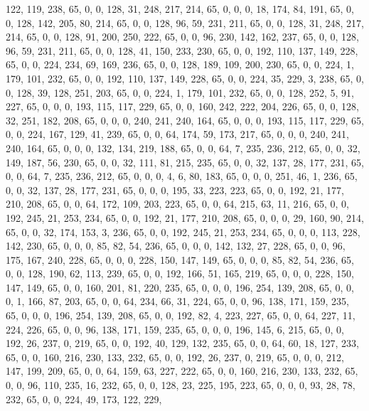 \begin{DoxyCode}
       122, 119, 238, 65, 0, 0, 128, 31, 248, 217, 214, 65, 0, 0, 0, 18, 174, 84, 191, 65, 0, 0, 128, 142, 205, 80,
       214, 65, 0, 0, 128, 96, 59, 231, 211, 65, 0, 0, 128, 31, 248, 217, 214, 65, 0, 0, 128, 91, 200, 250, 222, 65,
       0, 0, 96, 230, 142, 162, 237, 65, 0, 0, 128, 96, 59, 231, 211, 65, 0, 0, 128, 41, 150, 233, 230, 65, 0, 0,
       192, 110, 137, 149, 228, 65, 0, 0, 224, 234, 69, 169, 236, 65, 0, 0, 128, 189, 109, 200, 230, 65, 0, 0, 224,
       1, 179, 101, 232, 65, 0, 0, 192, 110, 137, 149, 228, 65, 0, 0, 224, 35, 229, 3, 238, 65, 0, 0, 128, 39, 128,
       251, 203, 65, 0, 0, 224, 1, 179, 101, 232, 65, 0, 0, 128, 252, 5, 91, 227, 65, 0, 0, 0, 193, 115, 117, 229,
       65, 0, 0, 160, 242, 222, 204, 226, 65, 0, 0, 128, 32, 251, 182, 208, 65, 0, 0, 0, 240, 241, 240, 164, 65,
       0, 0, 0, 193, 115, 117, 229, 65, 0, 0, 224, 167, 129, 41, 239, 65, 0, 0, 64, 174, 59, 173, 217, 65, 0, 0, 0,
       240, 241, 240, 164, 65, 0, 0, 0, 132, 134, 219, 188, 65, 0, 0, 64, 7, 235, 236, 212, 65, 0, 0, 32, 149, 187,
       56, 230, 65, 0, 0, 32, 111, 81, 215, 235, 65, 0, 0, 32, 137, 28, 177, 231, 65, 0, 0, 64, 7, 235, 236, 212,
       65, 0, 0, 0, 4, 6, 80, 183, 65, 0, 0, 0, 251, 46, 1, 236, 65, 0, 0, 32, 137, 28, 177, 231, 65, 0, 0, 0, 195,
       33, 223, 223, 65, 0, 0, 192, 21, 177, 210, 208, 65, 0, 0, 64, 172, 109, 203, 223, 65, 0, 0, 64, 215, 63,
       11, 216, 65, 0, 0, 192, 245, 21, 253, 234, 65, 0, 0, 192, 21, 177, 210, 208, 65, 0, 0, 0, 29, 160, 90, 214,
       65, 0, 0, 32, 174, 153, 3, 236, 65, 0, 0, 192, 245, 21, 253, 234, 65, 0, 0, 0, 113, 228, 142, 230, 65, 0, 0,
       0, 85, 82, 54, 236, 65, 0, 0, 0, 142, 132, 27, 228, 65, 0, 0, 96, 175, 167, 240, 228, 65, 0, 0, 0, 228, 150,
       147, 149, 65, 0, 0, 0, 85, 82, 54, 236, 65, 0, 0, 128, 190, 62, 113, 239, 65, 0, 0, 192, 166, 51, 165, 219,
       65, 0, 0, 0, 228, 150, 147, 149, 65, 0, 0, 160, 201, 81, 220, 235, 65, 0, 0, 0, 196, 254, 139, 208, 65, 0,
       0, 0, 1, 166, 87, 203, 65, 0, 0, 64, 234, 66, 31, 224, 65, 0, 0, 96, 138, 171, 159, 235, 65, 0, 0, 0, 196,
       254, 139, 208, 65, 0, 0, 192, 82, 4, 223, 227, 65, 0, 0, 64, 227, 11, 224, 226, 65, 0, 0, 96, 138, 171, 159,
       235, 65, 0, 0, 0, 196, 145, 6, 215, 65, 0, 0, 192, 26, 237, 0, 219, 65, 0, 0, 192, 40, 129, 132, 235, 65, 0,
       0, 64, 60, 18, 127, 233, 65, 0, 0, 160, 216, 230, 133, 232, 65, 0, 0, 192, 26, 237, 0, 219, 65, 0, 0, 0,
       212, 147, 199, 209, 65, 0, 0, 64, 159, 63, 227, 222, 65, 0, 0, 160, 216, 230, 133, 232, 65, 0, 0, 96, 110, 235,
       16, 232, 65, 0, 0, 128, 23, 225, 195, 223, 65, 0, 0, 0, 93, 28, 78, 232, 65, 0, 0, 224, 49, 173, 122, 229,

\end{DoxyCode}
